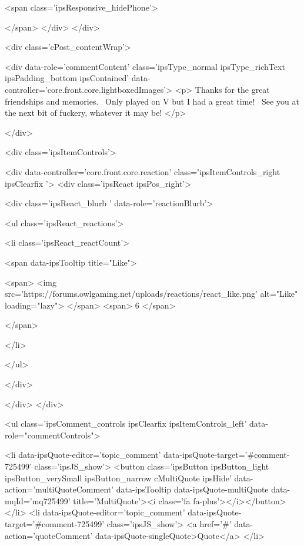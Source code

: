 			<span class='ipsResponsive_hidePhone'>
				
				
			</span>
		</div>
	</div>

	

    

	<div class='cPost_contentWrap'>
		
		<div data-role='commentContent' class='ipsType_normal ipsType_richText ipsPadding_bottom ipsContained' data-controller='core.front.core.lightboxedImages'>
			<p>
	Thanks for the great friendships and memories.  Only played on V but I had a great time!  See you at the next bit of fuckery, whatever it may be!
</p>


			
		</div>

		
			<div class='ipsItemControls'>
				
					
						

	<div data-controller='core.front.core.reaction' class='ipsItemControls_right ipsClearfix '>	
		<div class='ipsReact ipsPos_right'>
			
				
				<div class='ipsReact_blurb ' data-role='reactionBlurb'>
					
						

	
	<ul class='ipsReact_reactions'>
		
		
			
				
				<li class='ipsReact_reactCount'>
					
						<span data-ipsTooltip title="Like">
					
							<span>
								<img src='https://forums.owlgaming.net/uploads/reactions/react_like.png' alt="Like" loading="lazy">
							</span>
							<span>
								6
							</span>
					
						</span>
					
				</li>
			
		
	</ul>

					
				</div>
			
			
			
		</div>
	</div>

					
				
				<ul class='ipsComment_controls ipsClearfix ipsItemControls_left' data-role="commentControls">
					
						
							<li data-ipsQuote-editor='topic_comment' data-ipsQuote-target='#comment-725499' class='ipsJS_show'>
								<button class='ipsButton ipsButton_light ipsButton_verySmall ipsButton_narrow cMultiQuote ipsHide' data-action='multiQuoteComment' data-ipsTooltip data-ipsQuote-multiQuote data-mqId='mq725499' title='MultiQuote'><i class='fa fa-plus'></i></button>
							</li>
							<li data-ipsQuote-editor='topic_comment' data-ipsQuote-target='#comment-725499' class='ipsJS_show'>
								<a href='#' data-action='quoteComment' data-ipsQuote-singleQuote>Quote</a>
							</li>
						
